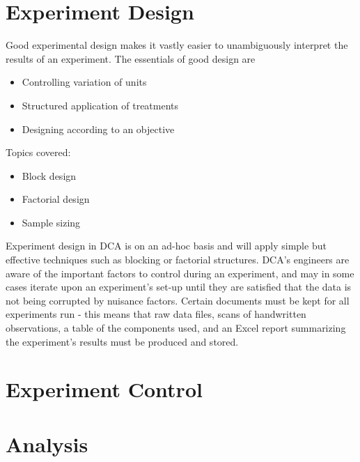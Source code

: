 \documentclass[11pt,a4paper,article]{memoir} %
\begin{document}






\section{Experiment Design}
Good experimental design makes it vastly easier to unambiguously interpret the results of an experiment. The essentials of good design are
\begin{itemize}
\item Controlling variation of units
\item Structured application of treatments
\item Designing according to an objective
\end{itemize}
Topics covered:
\begin{itemize}
\item Block design
\item Factorial design
\item Sample sizing
\end{itemize}

Experiment design in DCA is on an ad-hoc basis and will apply simple but effective techniques such as blocking or factorial structures. DCA's engineers are aware of the important factors to control during an experiment, and may in some cases iterate upon an experiment's set-up until they are satisfied that the data is not being corrupted by nuisance factors.
Certain documents must be kept for all experiments run - this means that raw data files, scans of handwritten observations, a table of the components used, and an Excel report summarizing the experiment's results must be produced and stored.

\section{Experiment Control}

\section{Analysis}
\end{document}

